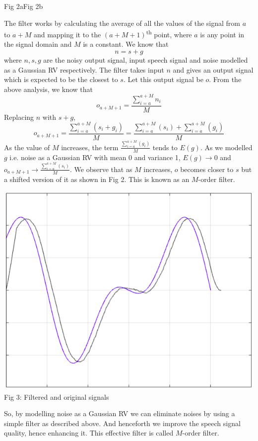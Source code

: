 \documentclass[10pt,twocolumn,letterpaper]{article}
\begin{document}
\begin{center}
    Fig 2a\hspace{3.5cm}Fig 2b   
\end{center}
The filter works by calculating the average of all the values of the signal from $a$ to $a+M$ and mapping it to the $(a+M+1)$\textsuperscript{th} point, where $a$ is any point in the signal domain and $M$ is a constant. We know that $$n = s + g$$ where $n, s, g$ are the noisy output signal, input speech signal and noise modelled as a Gaussian RV respectively. The filter takes input $n$ and gives an output signal which is expected to be the closest to $s$. Let this output signal be $o$. From the above analysis, we know that $$o_{a+M+1} = \frac{\sum_{i=a}^{a+M}n_i}{M}$$ Replacing $n$ with $s+g$, $$o_{a+M+1} = \frac{\sum_{i=a}^{a+M}(s_i+g_i)}{M} = \frac{\sum_{i=a}^{a+M}(s_i)+\sum_{i=a}^{a+M}(g_i)}{M}$$ As the value of $M$ increases, the term $\frac{\sum_{i=a}^{a+M}(g_i)}{M}$ tends to $E(g)$. As we modelled $g$ i.e. noise as a Gaussian RV with mean 0 and variance 1, $E(g)\to 0$ and $o_{a+M+1}\to \frac{\sum_{i=a}^{a+M}(s_i)}{M}$. We observe that as $M$ increases, $o$ becomes closer to $s$ but a shifted version of it as shown in Fig 2. This is known as an $M$-order filter. 
\begin{center}
\includegraphics[scale=0.25]{orgvsfilt.png}\\
Fig 3: Filtered and original signals
\end{center}

So, by modelling noise as a Gaussian RV we can eliminate noises by using a simple filter as described above. And henceforth we improve the speech signal quality, hence enhancing it. This effective filter is called $M$-order filter.\\
\end{document}
